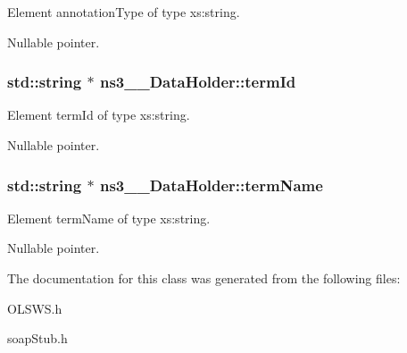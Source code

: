 Element annotationType of type xs:string. 

Nullable pointer. \hypertarget{classns3____DataHolder_aef8ad62355d41f92fb80a139531394f3}{
\subsubsection[{termId}]{\setlength{\rightskip}{0pt plus 5cm}std::string $\ast$ {\bf ns3\_\-\_\-DataHolder::termId}}}
\label{classns3____DataHolder_aef8ad62355d41f92fb80a139531394f3}


Element termId of type xs:string. 

Nullable pointer. \hypertarget{classns3____DataHolder_a4eadd86c4e0badbcadae7742becc25f8}{
\subsubsection[{termName}]{\setlength{\rightskip}{0pt plus 5cm}std::string $\ast$ {\bf ns3\_\-\_\-DataHolder::termName}}}
\label{classns3____DataHolder_a4eadd86c4e0badbcadae7742becc25f8}


Element termName of type xs:string. 

Nullable pointer. 

The documentation for this class was generated from the following files:\begin{DoxyCompactItemize}
\item 
OLSWS.h\item 
soapStub.h\end{DoxyCompactItemize}
